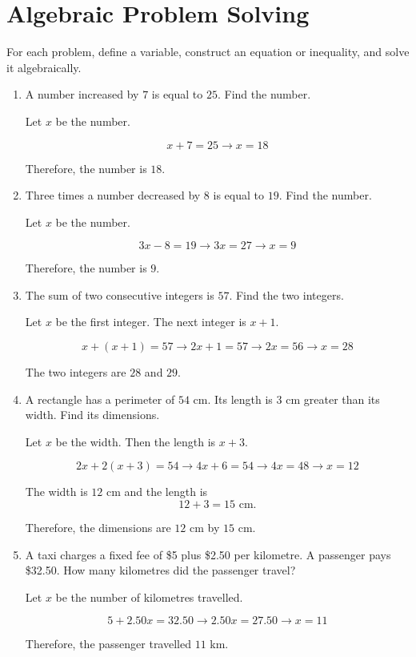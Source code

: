 	\begin{minipage}[t]{0.6\textwidth}
		
		\section{Algebraic Problem Solving}
		
		For each problem, define a variable, construct an equation or inequality, and solve it algebraically.
		
		\begin{enumerate}
			\item
			A number increased by $7$ is equal to $25$. Find the number.
			
			Let $x$ be the number.
			
			\[
			x+7=25 \longrightarrow x=18
			\]
			
			Therefore, the number is $18$.
			
			\item
			Three times a number decreased by $8$ is equal to $19$. Find the number.
			
			Let $x$ be the number.
			
			\[
			3x-8=19 \longrightarrow 3x=27 \longrightarrow x=9
			\]
			
			Therefore, the number is $9$.
			
			\item
			The sum of two consecutive integers is $57$. Find the two integers.
			
			Let $x$ be the first integer. The next integer is $x+1$.
			
			\[
			x+(x+1)=57
			\longrightarrow 2x+1=57
			\longrightarrow 2x=56
			\longrightarrow x=28
			\]
			
			The two integers are $28$ and $29$.
			
			\item
			A rectangle has a perimeter of $54$ cm. Its length is $3$ cm greater than its width. Find its dimensions.
			
			Let $x$ be the width. Then the length is $x+3$.
			
			\[
			2x+2(x+3)=54
			\longrightarrow 4x+6=54
			\longrightarrow 4x=48
			\longrightarrow x=12
			\]
			
			The width is $12$ cm and the length is
			\[
			12+3=15\text{ cm}.
			\]
			
			Therefore, the dimensions are $12$ cm by $15$ cm.
			
			\item
			A taxi charges a fixed fee of \$5 plus \$2.50 per kilometre.
			A passenger pays \$32.50. How many kilometres did the passenger travel?
			
			Let $x$ be the number of kilometres travelled.
			
			\[
			5+2.50x=32.50
			\longrightarrow 2.50x=27.50
			\longrightarrow x=11
			\]
			
			Therefore, the passenger travelled $11$ km.
			\end{enumerate}
		
	\end{minipage}
